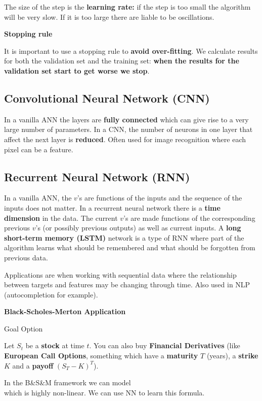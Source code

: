 The size of the step is the \textbf{learning rate:} if the step is too small the algorithm will be very slow. If it is too large there are liable to be oscillations.

\textbf{Stopping rule}

It is important to use a stopping rule to \textbf{avoid over-fitting}. We calculate results for both the validation set and the training set: \textbf{when the results for the validation set start to get worse we stop}.

\subsection{Convolutional Neural Network (CNN)}

In a vanilla ANN the layers are \textbf{fully connected} which can give rise to a very large number of parameters. In a CNN, the number of neurons in one layer that affect the next layer is \textbf{reduced}. Often used for image recognition where each pixel can be a feature.
\subsection{Recurrent Neural Network (RNN)}

In a vanilla ANN, the $v$’s are functions of the inputs and the sequence of the inputs does not matter. In a recurrent neural network there is a \textbf{time dimension} in the data. The current $v$’s are made functions of the corresponding previous $v$’s (or possibly previous outputs) as well as current inputs. A \textbf{long short-term memory (LSTM)} network is a type of RNN where part of the algorithm learns what should be remembered and what should be forgotten from previous data.

Applications are when working with sequential data where the relationship between targets and features may be changing through time. Also used in NLP (autocompletion for example).

\textbf{Black-Scholes-Merton Application}

Goal Option

Let $S_{t}$ be a \textbf{stock} at time $t$. You can also buy \textbf{Financial Derivatives} (like \textbf{European Call Options}, something which have a \textbf{maturity} $T$ (years), a \textbf{strike} $K$ and a \textbf{payoff} $( S_{T} -K)^{T}$).

In the B\&S\&M framework we can model
\begin{equation*}
    [ \dotsc unreadable\ from\ blackboard\dotsc ]
\end{equation*}
which is highly non-linear. We can use NN to learn this formula.
